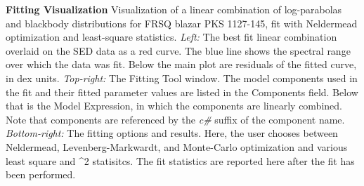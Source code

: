 \textbf{\label{fig:fitting} Fitting Visualization} Visualization of a linear combination of log-parabolas and blackbody distributions for FRSQ blazar PKS 1127-145, fit with Neldermead optimization and least-square statistics. \textit{Left:} The best fit linear combination overlaid on the SED data as a red curve. The blue line shows the spectral range over which the data was fit. Below the main plot are residuals of the fitted curve, in dex units. \textit{Top-right:} The Fitting Tool window. The model components used in the fit and their fitted parameter values are listed in the Components field. Below that is the Model Expression, in which the components are linearly combined. Note that components are referenced by the \textit{c#} suffix of the component name. \textit{Bottom-right:} The fitting options and results. Here, the user chooses between Neldermead, Levenberg-Markwardt, and Monte-Carlo optimization and various least square and \mathrm{\Chi}^{2} statisitcs. The fit statistics are reported here after the fit has been performed.